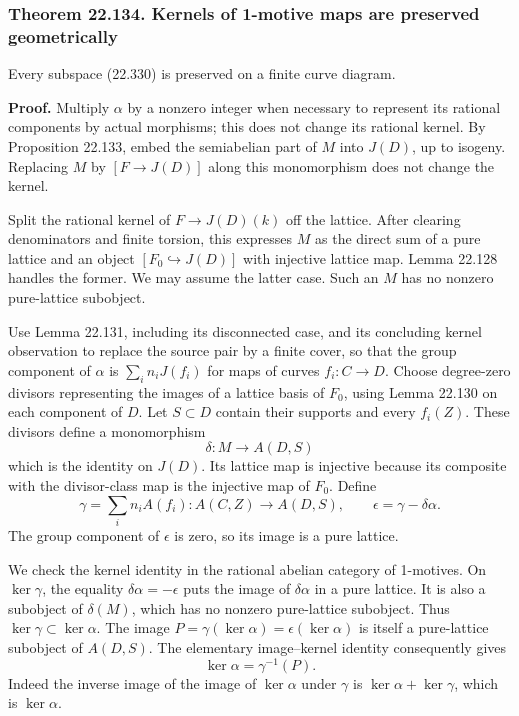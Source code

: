 \documentclass[
  11pt,
  a4paper,
]{article}
\begin{document}
\subsubsection{Theorem 22.134. Kernels of 1-motive maps are preserved
geometrically}\label{theorem-22.134.-kernels-of-1-motive-maps-are-preserved-geometrically}

Every subspace (22.330) is preserved on a finite curve diagram.

\textbf{Proof.} Multiply \(\alpha\) by a nonzero integer when necessary
to represent its rational components by actual morphisms; this does not
change its rational kernel. By Proposition 22.133, embed the semiabelian
part of \(M\) into \(J(D)\), up to isogeny. Replacing \(M\) by
\([F\to J(D)]\) along this monomorphism does not change the kernel.

Split the rational kernel of \(F\to J(D)(k)\) off the lattice. After
clearing denominators and finite torsion, this expresses \(M\) as the
direct sum of a pure lattice and an object \([F_0\hookrightarrow J(D)]\)
with injective lattice map. Lemma 22.128 handles the former. We may
assume the latter case. Such an \(M\) has no nonzero pure-lattice
subobject.

Use Lemma 22.131, including its disconnected case, and its concluding
kernel observation to replace the source pair by a finite cover, so that
the group component of \(\alpha\) is \(\sum_i n_iJ(f_i)\) for maps of
curves \(f_i:C\to D\). Choose degree-zero divisors representing the
images of a lattice basis of \(F_0\), using Lemma 22.130 on each
component of \(D\). Let \(S\subset D\) contain their supports and every
\(f_i(Z)\). These divisors define a monomorphism \[
 \delta:M\longrightarrow A(D,S)
 \tag{22.346}
\] which is the identity on \(J(D)\). Its lattice map is injective
because its composite with the divisor-class map is the injective map of
\(F_0\). Define \[
 \gamma=\sum_i n_i A(f_i):A(C,Z)\to A(D,S),
 \qquad \epsilon=\gamma-\delta\alpha.
 \tag{22.347}
\] The group component of \(\epsilon\) is zero, so its image is a pure
lattice.

We check the kernel identity in the rational abelian category of
1-motives. On \(\ker\gamma\), the equality \(\delta\alpha=-\epsilon\)
puts the image of \(\delta\alpha\) in a pure lattice. It is also a
subobject of \(\delta(M)\), which has no nonzero pure-lattice subobject.
Thus \(\ker\gamma\subset\ker\alpha\). The image
\(P=\gamma(\ker\alpha)=\epsilon(\ker\alpha)\) is itself a pure-lattice
subobject of \(A(D,S)\). The elementary image--kernel identity
consequently gives \[
 \ker\alpha=\gamma^{-1}(P).
 \tag{22.348}
\] Indeed the inverse image of the image of \(\ker\alpha\) under
\(\gamma\) is \(\ker\alpha+\ker\gamma\), which is \(\ker\alpha\).
\end{document}

